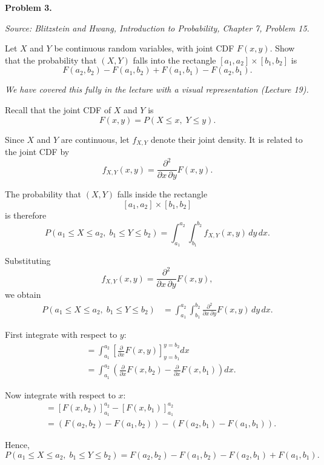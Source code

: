 \documentclass[11pt]{article}
\newcommand{\source}[2]{%
    \vspace{0.15cm}
    {\small\textit{Source: Blitzstein and Hwang, \textit{Introduction to Probability}, Chapter #1, Problem #2.}}
}
\begin{document}
 
\begin{problemheader}
\textbf{Problem 3.}
\end{problemheader}
\source{7}{15}

Let $X$ and $Y$ be continuous random variables, with joint CDF $F(x,y)$. Show that the probability that $(X,Y)$ falls into the rectangle $[a_1,a_2]\times[b_1,b_2]$ is
\[
F(a_2,b_2)-F(a_1,b_2)+F(a_1,b_1)-F(a_2,b_1).
\]

\begin{solutionbox}
\textit{We have covered this fully in the lecture with a visual representation (Lecture 19). }

Recall that the joint CDF of $X$ and $Y$ is
$$
F(x,y)=P(X\le x,\;Y\le y).
$$

Since $X$ and $Y$ are continuous, let $f_{X,Y}$ denote their joint density. It is related to the joint CDF by
$$
f_{X,Y}(x,y)
=
\frac{\partial^2}{\partial x\,\partial y}F(x,y).
$$

The probability that $(X,Y)$ falls inside the rectangle
$$
[a_1,a_2]\times[b_1,b_2]
$$
is therefore
$$
P(a_1\le X\le a_2,\;b_1\le Y\le b_2)
=
\int_{a_1}^{a_2}\int_{b_1}^{b_2}
f_{X,Y}(x,y)\,dy\,dx.
$$

Substituting
$$
f_{X,Y}(x,y)
=
\frac{\partial^2}{\partial x\,\partial y}F(x,y),
$$
we obtain
$$
\begin{aligned}
P(a_1\le X\le a_2,\;b_1\le Y\le b_2)
&=
\int_{a_1}^{a_2}
\int_{b_1}^{b_2}
\frac{\partial^2}{\partial x\,\partial y}F(x,y)
\,dy\,dx.
\end{aligned}
$$

First integrate with respect to $y$:
$$
\begin{aligned}
&=
\int_{a_1}^{a_2}
\left[
\frac{\partial}{\partial x}F(x,y)
\right]_{y=b_1}^{y=b_2}
dx\\
&=
\int_{a_1}^{a_2}
\left(
\frac{\partial}{\partial x}F(x,b_2)
-
\frac{\partial}{\partial x}F(x,b_1)
\right)dx.
\end{aligned}
$$

Now integrate with respect to $x$:
$$
\begin{aligned}
&=
\left[F(x,b_2)\right]_{a_1}^{a_2}
-
\left[F(x,b_1)\right]_{a_1}^{a_2}\\
&=
\left(F(a_2,b_2)-F(a_1,b_2)\right)
-
\left(F(a_2,b_1)-F(a_1,b_1)\right).
\end{aligned}
$$

Hence,
$$
P(a_1\le X\le a_2,\;b_1\le Y\le b_2)
=
F(a_2,b_2)-F(a_1,b_2)
-F(a_2,b_1)+F(a_1,b_1).
$$


\end{solutionbox}
\end{document}
